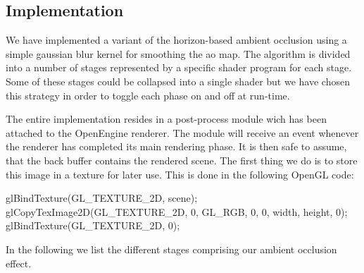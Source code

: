 \subsection{Implementation}

We have implemented a variant of the horizon-based ambient occlusion
using a simple gaussian blur kernel for smoothing the ao map.  The
algorithm is divided into a number of stages represented by a specific
shader program for each stage. Some of these stages could be collapsed
into a single shader but we have chosen this strategy in order to
toggle each phase on and off at run-time.

The entire implementation resides in a post-process module wich has
been attached to the OpenEngine renderer. The module will receive an
event whenever the renderer has completed its main rendering phase. It
is then safe to assume, that the back buffer contains the rendered
scene.  The first thing we do is to store this image in a texture for
later use. This is done in the following OpenGL code:
\begin{cppcode}
  glBindTexture(GL_TEXTURE_2D, scene);
  glCopyTexImage2D(GL_TEXTURE_2D, 0, GL_RGB, 0, 0, width, height, 0);
  glBindTexture(GL_TEXTURE_2D, 0);
\end{cppcode}

In the following we list the different stages comprising our ambient
occlusion effect.

